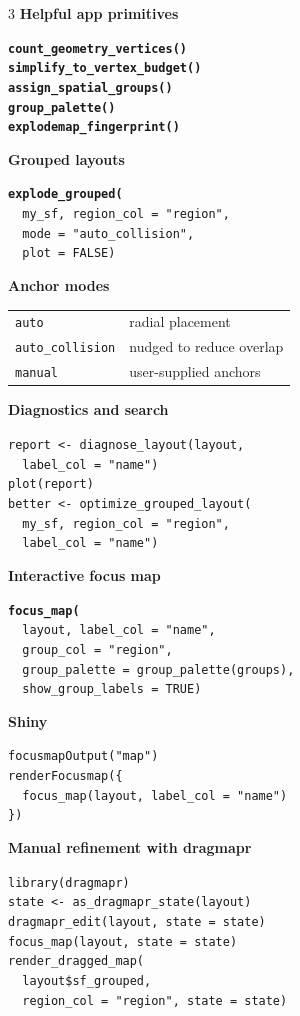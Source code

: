 \documentclass[9pt,landscape]{article}
\newcommand{\fn}[1]{\texttt{\footnotesize\bfseries\color{primary}#1}}
\newcommand{\code}[1]{\texttt{\footnotesize\color{ink}#1}}
\newcommand{\sectionbox}[1]{%
  \vspace{4pt}
  \colorbox{soft}{\parbox{\dimexpr\columnwidth-2\fboxsep}{\small\bfseries\color{primary}#1}}
  \vspace{2pt}
}
\newcommand{\minihead}[1]{{\footnotesize\bfseries\color{ink}#1}\par}
\begin{document}
\begin{multicols}{3}
\minihead{Helpful app primitives}
\fn{count\_geometry\_vertices()}\\
\fn{simplify\_to\_vertex\_budget()}\\
\fn{assign\_spatial\_groups()}\\
\fn{group\_palette()}\\
\fn{explodemap\_fingerprint()}

\sectionbox{Grouped layouts}
\fn{explode\_grouped(}\\
\code{\ \ my\_sf, region\_col = "region",}\\
\code{\ \ mode = "auto\_collision",}\\
\code{\ \ plot = FALSE)}

\minihead{Anchor modes}
\begin{tabular}{@{}ll@{}}
\code{auto} & {\footnotesize radial placement} \\
\code{auto\_collision} & {\footnotesize nudged to reduce overlap} \\
\code{manual} & {\footnotesize user-supplied anchors} \\
\end{tabular}

\sectionbox{Diagnostics and search}
\code{report <- diagnose\_layout(layout,}\\
\code{\ \ label\_col = "name")}\\
\code{plot(report)}\\[2pt]
\code{better <- optimize\_grouped\_layout(}\\
\code{\ \ my\_sf, region\_col = "region",}\\
\code{\ \ label\_col = "name")}

\sectionbox{Interactive focus map}
\fn{focus\_map(}\\
\code{\ \ layout, label\_col = "name",}\\
\code{\ \ group\_col = "region",}\\
\code{\ \ group\_palette = group\_palette(groups),}\\
\code{\ \ show\_group\_labels = TRUE)}

\minihead{Shiny}
\code{focusmapOutput("map")}\\
\code{renderFocusmap(\{}\\
\code{\ \ focus\_map(layout, label\_col = "name")}\\
\code{\})}

\sectionbox{Manual refinement with dragmapr}
\code{library(dragmapr)}\\
\code{state <- as\_dragmapr\_state(layout)}\\
\code{dragmapr\_edit(layout, state = state)}\\[2pt]
\code{focus\_map(layout, state = state)}\\
\code{render\_dragged\_map(}\\
\code{\ \ layout\$sf\_grouped,}\\
\code{\ \ region\_col = "region", state = state)}


\end{multicols}
\end{document}
